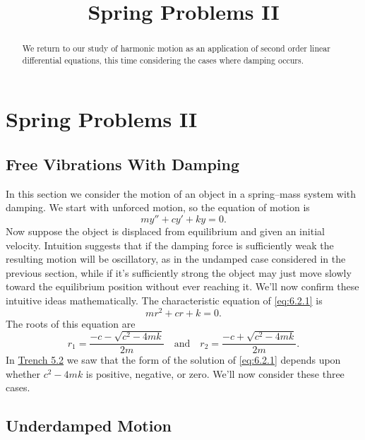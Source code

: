 \documentclass{ximera}
\title{Spring Problems II}
\begin{document}
 
\begin{abstract}
 We return to our study of harmonic motion as an application of second order linear differential equations, this time considering the cases where damping occurs.
\end{abstract}
 
\maketitle
 
\section*{Spring Problems II}
 
\subsection*{Free Vibrations With Damping}
 
In this section we consider the motion of an object in a spring--mass
system with damping. We start with unforced motion, so the equation of
motion is
\begin{equation}\label{eq:6.2.1}
my''+cy'+ky=0.
\end{equation}
Now suppose   the object is displaced from equilibrium and given an
initial velocity. Intuition suggests that if the damping force is
sufficiently weak the resulting motion will be oscillatory, as in the
undamped case considered in the previous section, while if it's
sufficiently strong the object may just move slowly toward the
equilibrium
position without ever reaching it. We'll now confirm these intuitive
ideas mathematically. The characteristic equation of \eqref{eq:6.2.1} is
$$
mr^2+cr+k=0.
$$
The roots of this equation are
\begin{equation}\label{eq:6.2.2}
r_1=\frac{-c-\sqrt{c^2-4mk}}{2m}\quad\mbox{and}\quad r_2=
\frac{-c+\sqrt{c^2-4mk}}{2m}.
\end{equation}
In \href{https://ximera.osu.edu/ode/main/constantCoefficientHomogeneousEquations/constantCoefficientHomogeneousEquations}{Trench 5.2} we saw that the form of the
solution of  \eqref{eq:6.2.1} depends upon whether $c^2-4mk$ is positive,
negative, or zero. We'll now consider these three cases.
 
\subsection*{Underdamped Motion}
 
\end{document}
